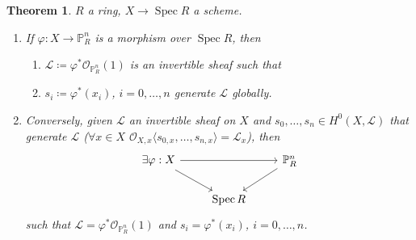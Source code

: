 \documentclass[12pt]{article}
\DeclareMathOperator{\Spec}{Spec}
\newtheorem*{theorem}{Theorem}
\theoremstyle{definition}
\theoremstyle{remark}
\begin{document}
\begin{theorem}
$R$ a ring, $X\rightarrow\Spec R$ a scheme.

\begin{enumerate}[label=\arabic*)]
\item\label{morphism_invertible_sheaf} If $\varphi:X\rightarrow\mathbb{P}_R^n$ is a morphism over $\Spec R$, then
\begin{enumerate}[label=\arabic*)]
\item $\mathcal{L}\coloneqq\varphi^*\mathcal{O}_{\mathbb{P}_R^n}(1)$ is an invertible sheaf such that
\item $s_i\coloneqq\varphi^*(x_i)$, $i=0,\ldots,n$ generate $\mathcal{L}$ globally.
\end{enumerate}

\item Conversely, given $\mathcal{L}$ an invertible sheaf on $X$ and $s_0,\ldots,s_n\in H^0(X,\mathcal{L})$ that generate $\mathcal{L}$ ($\forall x\in X$ $\mathcal{O}_{X,x}\langle s_{0,x},\ldots,s_{n,x}\rangle=\mathcal{L}_x$), then
\[
\begin{tikzcd}
\exists\varphi:X\arrow[rr]\arrow[rd]&&\mathbb{P}_R^n\arrow[ld]\\
&\Spec R
\end{tikzcd}
\]
such that $\mathcal{L}=\varphi^*\mathcal{O}_{\mathbb{P}_R^n}(1)$ and $s_i=\varphi^*(x_i)$, $i=0,\ldots,n$.
\end{enumerate}
\end{theorem}
\end{document}

